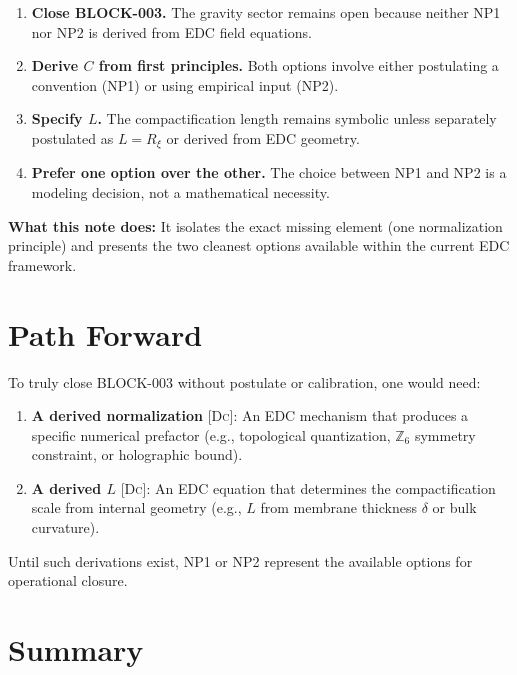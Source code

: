 \documentclass[11pt,a4paper]{article}
\theoremstyle{definition}
\newcommand{\Deriv}{\textsc{[Dc]}}
\begin{document}
\begin{enumerate}
\item \textbf{Close BLOCK-003.} The gravity sector remains open because
neither NP1 nor NP2 is derived from EDC field equations.

\item \textbf{Derive $C$ from first principles.} Both options involve
either postulating a convention (NP1) or using empirical input (NP2).

\item \textbf{Specify $L$.} The compactification length remains symbolic
unless separately postulated as $L = R_\xi$ or derived from EDC geometry.

\item \textbf{Prefer one option over the other.} The choice between NP1
and NP2 is a modeling decision, not a mathematical necessity.
\end{enumerate}

\textbf{What this note does:} It isolates the exact missing element
(one normalization principle) and presents the two cleanest options
available within the current EDC framework.

\section{Path Forward}

To truly close BLOCK-003 without postulate or calibration, one would need:

\begin{enumerate}
\item \textbf{A derived normalization} \Deriv: An EDC mechanism that
produces a specific numerical prefactor (e.g., topological quantization,
$\mathbb{Z}_6$ symmetry constraint, or holographic bound).

\item \textbf{A derived $L$} \Deriv: An EDC equation that determines the
compactification scale from internal geometry (e.g., $L$ from membrane
thickness $\delta$ or bulk curvature).
\end{enumerate}

Until such derivations exist, NP1 or NP2 represent the available options
for operational closure.

\section{Summary}
\end{document}
